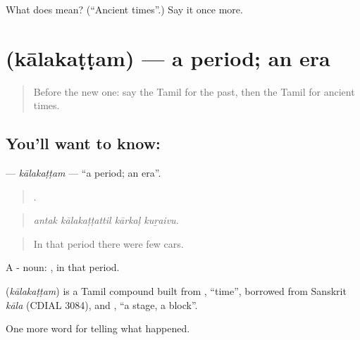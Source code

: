 \begin{tcolorbox}[breakable,colback=teal!4,colframe=teal!35!black,title={Before you move on}]
What does  mean? (\textquotedblleft{}Ancient times\textquotedblright{}.) Say it once more.
\end{tcolorbox}
\section[\texorpdfstring{\ta{காலகட்டம்} (kālakaṭṭam)}{காலகட்டம் (kālakaṭṭam)}]{ (kālakaṭṭam) — a period; an era}

\label{lesson:TA-C326-kalakattam}



\begin{quote}
Before the new one: say the Tamil for the past, then the Tamil for ancient times.
\end{quote}

\subsection*{You'll want to know: }
\textbf{} — \emph{kālakaṭṭam} — \textquotedblleft{}a period; an era\textquotedblright{}.

\begin{quote}
   .
\end{quote}

\begin{quote}
\emph{antak kālakaṭṭattil kārkaḷ kuṟaivu.}
\end{quote}

\begin{quote}
In that period there were few cars.
\end{quote}

A - noun: , in that period.

\begin{cousinweb}
\textbf{} (\emph{kālakaṭṭam}) is a Tamil compound built from , \textquotedblleft{}time\textquotedblright{}, borrowed from Sanskrit \emph{kāla} (CDIAL 3084), and , \textquotedblleft{}a stage, a block\textquotedblright{}.
\end{cousinweb}

\begin{grammarlens}[title={What you've built}]
One more word for telling what happened.
\end{grammarlens}

